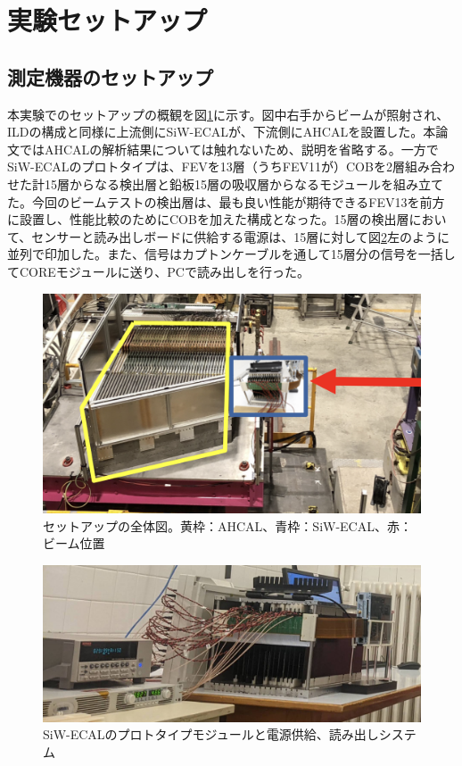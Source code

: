 \section{実験セットアップ}
\subsection{測定機器のセットアップ}
本実験でのセットアップの概観を図\ref{setup1}に示す。図中右手からビームが照射され、ILDの構成と同様に上流側にSiW-ECALが、下流側にAHCALを設置した。本論文ではAHCALの解析結果については触れないため、説明を省略する。一方でSiW-ECALのプロトタイプは、FEVを13層（うちFEV11が）COBを2層組み合わせた計15層からなる検出層と鉛板15層の吸収層からなるモジュールを組み立てた。今回のビームテストの検出層は、最も良い性能が期待できるFEV13を前方に設置し、性能比較のためにCOBを加えた構成となった。15層の検出層において、センサーと読み出しボードに供給する電源は、15層に対して図\ref{setup2}左のように並列で印加した。また、信号はカプトンケーブルを通して15層分の信号を一括してCOREモジュールに送り、PCで読み出しを行った。\\
\begin{figure}[h]
\begin{center}
 \includegraphics[keepaspectratio, scale=0.3]
 	{Figure/Beamtest/setup1.png}
 		\caption{セットアップの全体図。黄枠：AHCAL、青枠：SiW-ECAL、赤：ビーム位置}
		\label{setup1}
		\end{center}
\end{figure}

\begin{figure}[h]
\begin{center}
 \includegraphics[keepaspectratio, scale=0.2]
 	{Figure/Beamtest/setup2.png}
 		\caption{SiW-ECALのプロトタイプモジュールと電源供給、読み出しシステム}
		\label{setup2}
\end{center}
\end{figure}

